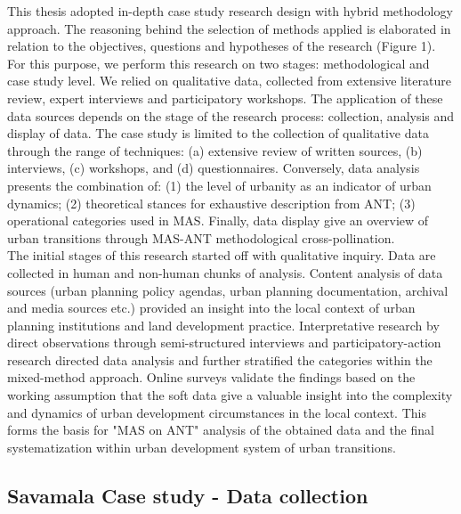 \documentclass[11pt]{report}
\begin{document}
This thesis adopted in-depth case study research design with hybrid methodology approach. The reasoning behind the selection of methods applied is elaborated in relation to the objectives, questions and hypotheses of the research (Figure 1).  
\\
For this purpose, we perform this research on two stages: methodological and case study level. We relied on qualitative data, collected from extensive literature review, expert interviews and participatory workshops. The application of these data sources depends on the stage of the research process: collection, analysis and display of data. The case study is limited to the collection of qualitative data through the range of techniques: (a) extensive review of written sources, (b) interviews, (c) workshops, and (d) questionnaires. Conversely, data analysis presents the combination of: (1) the level of urbanity as an indicator of urban dynamics; (2) theoretical stances for exhaustive description from ANT; (3) operational categories used in MAS. Finally, data display give an overview of urban transitions through MAS-ANT methodological cross-pollination. 
\\
The initial stages of this research started off with qualitative inquiry. Data are collected in human and non-human chunks of analysis. Content analysis of data sources (urban planning policy agendas, urban planning documentation, archival and media sources etc.) provided an insight into the local context of urban planning institutions and land development practice. Interpretative research by  direct observations through semi-structured interviews and participatory-action research directed data analysis and further stratified the categories within the mixed-method approach. Online surveys validate the findings based on the working assumption that the soft data give a valuable insight into the complexity and dynamics of urban development circumstances in the local context. This forms the basis for "MAS on ANT" analysis of the obtained data and the final systematization within urban development system of urban transitions.

\subsection{Savamala Case study - Data collection} \label{sec:predis}
\end{document}
